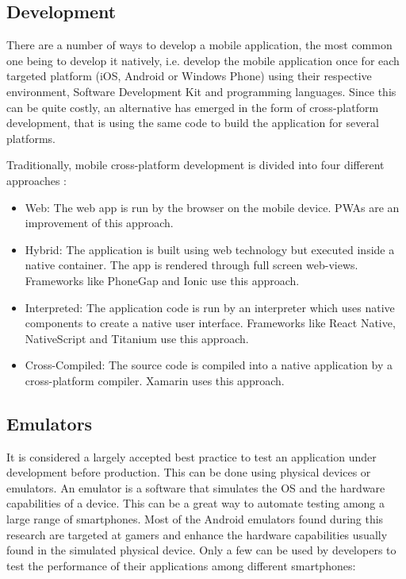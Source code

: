 \documentclass{kththesis}
\begin{document}
\subsection{Development}
There are a number of ways to develop a mobile application, the most common one being to develop it natively, i.e. develop the mobile application once for each targeted platform (iOS, Android or Windows Phone) using their respective environment, Software Development Kit and programming languages. Since this can be quite costly, an alternative has emerged in the form of cross-platform development, that is using the same code to build the application for several platforms.

Traditionally, mobile cross-platform development is divided into four different approaches \cite{CrossPlatform_dev}:
\begin{itemize}
    \item Web: The web app is run by the browser on the mobile device. PWAs are an improvement of this approach.
    \item Hybrid: The application is built using web technology but executed inside a native container. The app is rendered through full screen web-views. Frameworks like PhoneGap and Ionic \cite{crossplatform_approaches} use this approach.
    \item Interpreted: The application code is run by an interpreter which uses native components to create a native user interface. Frameworks like React Native, NativeScript and Titanium \cite{emulating_native_w_crossplatform} use this approach.
    \item Cross-Compiled: The source code is compiled into a native application by a cross-platform compiler. Xamarin \cite{crossplatform_approaches} uses this approach. 
\end{itemize}


\subsection{Emulators}
    It is considered a largely accepted best practice to test an application under development before production. This can be done using physical devices or emulators. An emulator is a software that simulates the OS and the hardware capabilities of a device\cite{emulator_def}. This can be a great way to automate testing among a large range of smartphones. Most of the Android emulators found during this research are targeted at gamers and enhance the hardware capabilities usually found in the simulated physical device. Only a few can be used by developers to test the performance of their applications among different smartphones:
    
\end{document}

